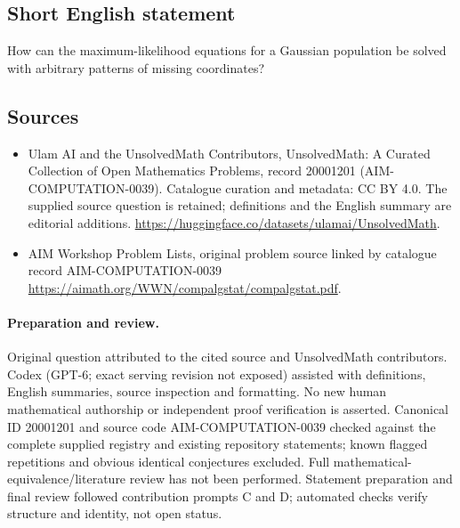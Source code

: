 \documentclass[11pt]{article}
\begin{document}
\subsection{Short English statement}
How can the maximum-likelihood equations for a Gaussian population be solved with arbitrary patterns of missing coordinates?
\subsection{Sources}
\begin{itemize}
\item[\hypertarget{source:20001201:1}{S1}] Ulam AI and the UnsolvedMath Contributors, UnsolvedMath: A Curated Collection of Open Mathematics Problems, record 20001201 (AIM-COMPUTATION-0039). Catalogue curation and metadata: CC BY 4.0. The supplied source question is retained; definitions and the English summary are editorial additions.
\url{https://huggingface.co/datasets/ulamai/UnsolvedMath}.
\item[\hypertarget{source:20001201:2}{S2}] AIM Workshop Problem Lists, original problem source linked by catalogue record AIM-COMPUTATION-0039
\url{https://aimath.org/WWN/compalgstat/compalgstat.pdf}.
\end{itemize}
\paragraph{Preparation and review.}
Original question attributed to the cited source and UnsolvedMath contributors. Codex (GPT-6; exact serving revision not exposed) assisted with definitions, English summaries, source inspection and formatting. No new human mathematical authorship or independent proof verification is asserted. Canonical ID 20001201 and source code AIM-COMPUTATION-0039 checked against the complete supplied registry and existing repository statements; known flagged repetitions and obvious identical conjectures excluded. Full mathematical-equivalence/literature review has not been performed. Statement preparation and final review followed contribution prompts C and D; automated checks verify structure and identity, not open status.
\label{end:20001201}
\end{document}

